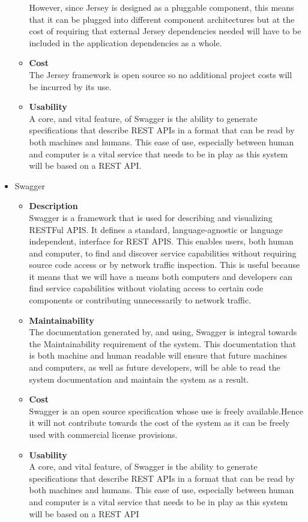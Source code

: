\documentclass[a4paper,10pt]{article}
\begin{document}
\begin{itemize}
\begin{itemize}
				However, since Jersey is designed as a pluggable component, this means that it can be plugged into different component architectures but at the cost of requiring that external Jersey dependencies needed will have to be included in the application dependencies as a whole.
				\item \textbf{Cost}\\
				The Jersey framework is open source so no additional project costs will be incurred by its use.
				\item \textbf{Usability}\\
				A core, and vital feature, of Swagger is the ability to generate specifications that describe REST APIs in a format that can be read by both machines and humans. This ease of use, especially between human and computer is a vital service that needs to be in play as this system will be based on a REST API.		
			\end{itemize}

		\item Swagger
			\begin{itemize}
				\item \textbf{Description}\\
				Swagger is a framework that is used for describing and visualizing RESTFul APIS. It defines a standard, language-agnostic or language independent, interface for REST APIS. This enables users, both human and computer, to find and discover service capabilities without requiring source code access or by network traffic inspection. This is useful because it means that we will have a means both computers and developers can find service capabilities without violating access to certain code components or contributing unnecessarily to network traffic.
				\item \textbf{Maintainability}\\
				The documentation generated by, and using, Swagger is integral towards the Maintainability requirement of the system. This documentation that is both machine and human readable will ensure that future machines and computers, as well as future developers, will be able to read the system documentation and maintain the system as a result.
				\item \textbf{Cost}\\
				Swagger is an open source specification  whose use is freely available.Hence it will not contribute towards the cost of the system as it can be freely used with commercial license provisions.
				\item \textbf{Usability}\\
				A core, and vital feature, of Swagger is the ability to generate specifications that describe REST APIs in a format that can be read by both machines and humans. This ease of use, especially between human and computer is a vital service that needs to be in play as this system will be based on a REST API
			\end{itemize}
	\end{itemize}
\end{document}
